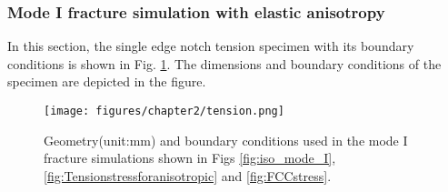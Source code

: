 \documentclass[3p,10pt,sort&compress]{elsarticle}
\begin{document}
\subsubsection{Mode I fracture simulation with elastic anisotropy}
In this section, the single edge notch tension specimen with its boundary conditions is shown in Fig. \ref{fig:tension}.
The dimensions and boundary conditions of the specimen are depicted in the figure.
\begin{figure}[!htb]
  \begin{center}
    \texttt{[image: figures/chapter2/tension.png]}
    \caption{Geometry(unit:mm) and boundary conditions used in the mode I fracture simulations shown in Figs \ref{fig:iso_mode_I}, \ref{fig:Tensionstressforanisotropic} and \ref{fig:FCCstress}.}
    \label{fig:tension}
  \end{center}
\end{figure}
\end{document}
